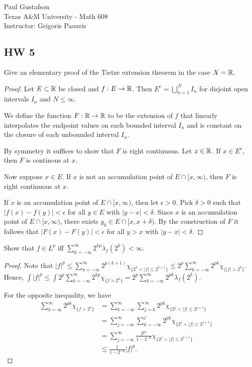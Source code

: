 \documentclass{article}
\begin{document}
\noindent Paul Gustafson\\
\noindent Texas A\&M University - Math 608 \\ 
\noindent Instructor: Grigoris Paouris

\subsection*{HW 5}
 Give an elementary proof of the Tietze extension theorem in the case $X = \mathbb{R}$.
\begin{proof}
Let $E \subset \mathbb{R}$ be closed and $f : E \to \mathbb{R}$. Then $E^c = \bigcup_{n=1}^N I_n$ for disjoint open intervals $I_n$ and $N \le \infty$.

We define the function $F:\mathbb{R} \to \mathbb{R}$ to be the extension of $f$ that linearly interpolates the endpoint values on 
each bounded interval $I_n$ and is constant on the closure of each unbounded interval $I_n$.

By symmetry it suffices to show that $F$ is right continuous. Let $x \in \mathbb{R}$. If $x \in E^c$, then $F$ is continous at $x$.  

Now suppose $x \in E$. If $x$ is not an accumulation point of $E \cap [x, \infty)$, then $F$ is right continuous at $x$.  

If $x$ is an accumulation point of $E \cap [x, \infty)$, then let $\epsilon > 0$.  Pick $\delta > 0$ such that $|f(x) - f(y)| < \epsilon$ for all $y \in E$ with $|y - x| < \delta$.
Since $x$ is an accumulation point of $E \cap [x, \infty)$, there exists $y_0 \in E \cap [x, x + \delta)$.  By the construction of $F$ it follows
 that $|F(x) - F(y)| < \epsilon$ for all $y >x$ with $|y - x| < \delta$.
\end{proof}

 Show that $f \in L^p$ iff $\sum_{k= -\infty}^\infty 2^{kp} \lambda_f(2^k) < \infty$.
\begin{proof}

Note that $|f|^p \le \sum_{k=-\infty}^\infty 2^{p(k+1)} \chi_{\{2^k < |f| \le 2^{k+1} \}} \le 2^p \sum_{k=-\infty}^\infty 2^{pk} \chi_{\{|f| > 2^k \}}$. Hence, $\int |f|^p \le \int 2^p \sum_{k=-\infty}^\infty 2^{kp} \chi_{\{f >2^k \}} = 2^p \sum_{k=-\infty}^\infty 2^{pk} \lambda_f(2^k)$.

For the opposite inequality, we have 
\begin{align*}
\sum_{k=\infty}^\infty 2^{pk} \chi_{\{f >2^k \}} & = \sum_{k=-\infty}^\infty \sum_{j=k}^{\infty} 2^{pk} \chi_{\{ 2^j < |f| \le 2^{j+1}\}}
\\ & = \sum_{j=-\infty}^\infty \sum_{k=-\infty}^{j} 2^{pk} \chi_{\{ 2^j < |f| \le 2^{j+1}\}} 
\\ & = \sum_{j=-\infty}^\infty \frac{2^{pj}} { 1 - 2^{-p}} \chi_{\{ 2^j < |f| \le 2^{j+1}\}} 
\\ & \le \frac{1}{ 1 - 2^{-p}} |f|^p.
\end{align*}
\end{proof}
\end{document}
